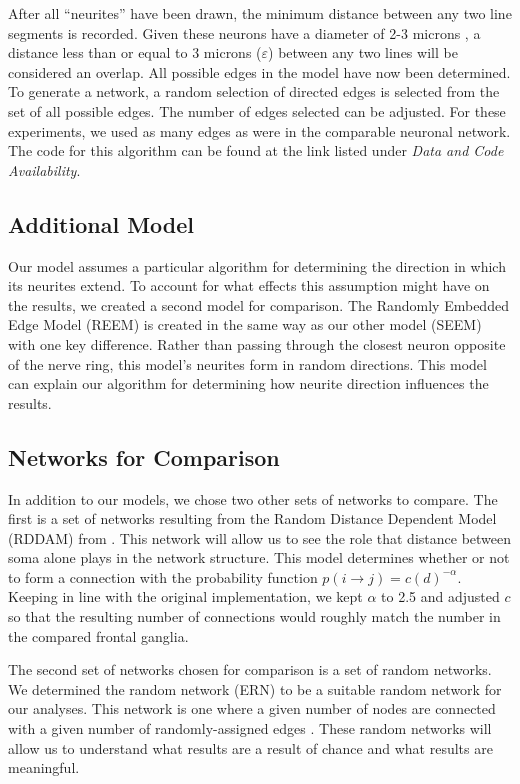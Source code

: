 After all ``neurites'' have been drawn, the minimum distance between any two line segments is recorded. 
Given these neurons have a diameter of 2-3 microns \citep{Schafer}, a distance less than or equal to 3 microns ($\varepsilon$) between any two lines will be considered an overlap. 
All possible edges in the model have now been determined. 
To generate a network, a random selection of directed edges is selected from the set of all possible edges. 
The number of edges selected can be adjusted. 
For these experiments, we used as many edges as were in the comparable \ce neuronal network. 
The code for this algorithm can be found at the link listed under \textit{Data and Code Availability}.

\subsection{Additional Model}

Our model assumes a particular algorithm for determining the direction in which its neurites extend.
To account for what effects this assumption might have on the results, we created a second model for comparison. 
The Randomly Embedded Edge Model (REEM) is created in the same way as our other model (SEEM) with one key difference. 
Rather than passing through the closest neuron opposite of the nerve ring, this model's neurites form in random directions.
This model can explain our algorithm for determining how neurite direction influences the results.

\subsection{Networks for Comparison}
In addition to our models, we chose two other sets of networks to compare. 
The first is a set of networks resulting from the Random Distance Dependent Model (RDDAM) from \cite{Itzhack}. 
This network will allow us to see the role that distance between soma alone plays in the network structure.
This model determines whether or not to form a connection with the probability function $p(i \rightarrow j)= c(d)^{- \alpha}$. 
Keeping in line with the original implementation, we kept $\alpha$ to 2.5 and adjusted $c$ so that the resulting number of connections would roughly match the number in the compared \ce frontal ganglia.

The second set of networks chosen for comparison is a set of random networks. 
We determined the \er random network (ERN) to be a suitable random network for our analyses.
This network is one where a given number of nodes are connected with a given number of randomly-assigned edges \citep{Erdos}.
These random networks will allow us to understand what results are a result of chance and what results are meaningful.

